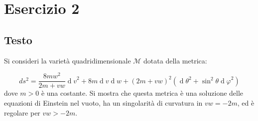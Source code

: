 \documentclass[]{scrartcl}
\renewcommand{\d}[1]{\ensuremath{\operatorname{d}\!{#1}}}
\begin{document}
\section*{Esercizio 2}

\subsection*{Testo}
Si consideri la varietà quadridimensionale $ \mathcal{M} $ dotata della metrica:

\begin{equation}
  \label{eq:metrica_problema_2}
  ds^2 = \frac{8 m w^2}{2 m + v w} \d v ^2 + 8 m \d v  \d w + \left( 2m + v w \right)^2 \left( \d \theta^2 + \sin^2 \theta \d \varphi^2 \right)
\end{equation}
dove $ m > 0 $ è una costante. Si mostra che questa metrica è una soluzione delle equazioni di Einstein nel vuoto,
ha un singolarità di curvatura in $ vw = - 2 m $, ed è regolare per $ vw > -2m $.
\end{document}
